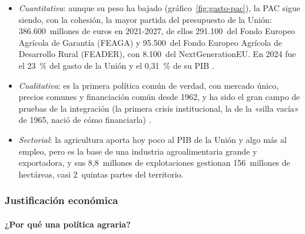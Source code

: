 \documentclass[11pt]{article}
\begin{document}
\begin{itemize}
\item \emph{Cuantitativa}: aunque su peso ha bajado (gráfico~\ref{fig:gasto-pac}), la PAC sigue siendo, con la cohesión, la mayor partida del presupuesto de la Unión: 386.600~millones de euros en 2021-2027, de ellos 291.100~del Fondo Europeo Agrícola de Garantía (FEAGA) y 95.500~del Fondo Europeo Agrícola de Desarrollo Rural (FEADER), con 8.100~del NextGenerationEU\nocite{CE2026FondosPAC}. En 2024 fue el 23~\% del gasto de la Unión y el 0,31~\% de su PIB\nocite{CE2026GastoPAC} .
\item \emph{Cualitativa}: es la primera política común de verdad, con mercado único, precios comunes y financiación común desde 1962, y ha sido el gran campo de pruebas de la integración (la primera crisis institucional, la de la «silla vacía» de 1965, nació de cómo financiarla) .
\item \emph{Sectorial}: la agricultura aporta hoy poco al PIB de la Unión y algo más al empleo, pero es la base de una industria agroalimentaria grande y exportadora, y sus 8,8~millones de explotaciones gestionan 156~millones de hectáreas, casi 2~quintas partes del territorio\nocite{Eurostat2026Explotaciones}.
\end{itemize}

\subsubsection{Justificación económica}\label{sec:justificacion-economica}

\paragraph{¿Por qué una política agraria?}
\end{document}
